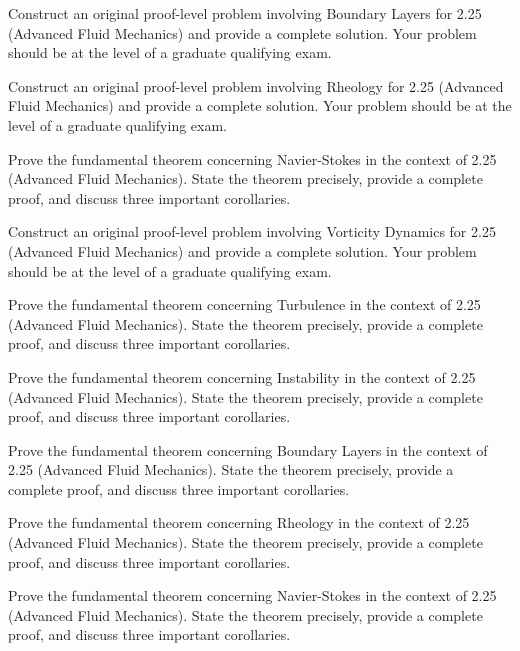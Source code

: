 \documentclass[12pt,a4paper]{exam}
\begin{document}
\begin{questions}
\vspace{0.3cm}

\question[5]
Construct an original proof-level problem involving Boundary Layers for 2.25 (Advanced Fluid Mechanics) and provide a complete solution. Your problem should be at the level of a graduate qualifying exam.

\vspace{0.3cm}

\question[5]
Construct an original proof-level problem involving Rheology for 2.25 (Advanced Fluid Mechanics) and provide a complete solution. Your problem should be at the level of a graduate qualifying exam.

\vspace{0.3cm}

\question[3]
Prove the fundamental theorem concerning Navier-Stokes in the context of 2.25 (Advanced Fluid Mechanics). State the theorem precisely, provide a complete proof, and discuss three important corollaries.

\vspace{0.3cm}

\question[7]
Construct an original proof-level problem involving Vorticity Dynamics for 2.25 (Advanced Fluid Mechanics) and provide a complete solution. Your problem should be at the level of a graduate qualifying exam.

\vspace{0.3cm}

\question[5]
Prove the fundamental theorem concerning Turbulence in the context of 2.25 (Advanced Fluid Mechanics). State the theorem precisely, provide a complete proof, and discuss three important corollaries.

\vspace{0.3cm}

\question[4]
Prove the fundamental theorem concerning Instability in the context of 2.25 (Advanced Fluid Mechanics). State the theorem precisely, provide a complete proof, and discuss three important corollaries.

\vspace{0.3cm}

\question[2]
Prove the fundamental theorem concerning Boundary Layers in the context of 2.25 (Advanced Fluid Mechanics). State the theorem precisely, provide a complete proof, and discuss three important corollaries.

\vspace{0.3cm}

\question[3]
Prove the fundamental theorem concerning Rheology in the context of 2.25 (Advanced Fluid Mechanics). State the theorem precisely, provide a complete proof, and discuss three important corollaries.

\vspace{0.3cm}

\question[3]
Prove the fundamental theorem concerning Navier-Stokes in the context of 2.25 (Advanced Fluid Mechanics). State the theorem precisely, provide a complete proof, and discuss three important corollaries.

\vspace{0.3cm}

\end{questions}
\end{document}
